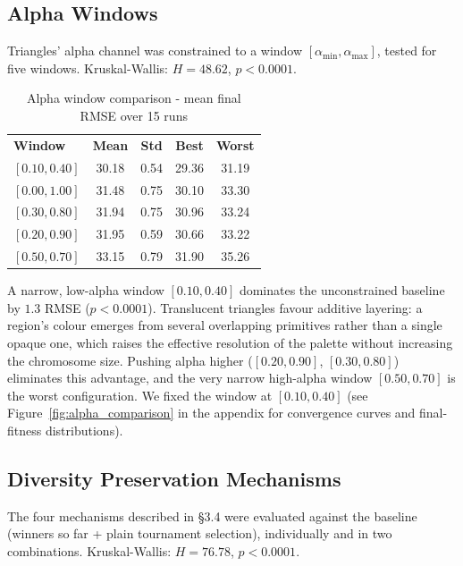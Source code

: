 \documentclass[11pt,a4paper]{article}
\newcommand{\tH}[1]{\textcolor{novagreen}{\textbf{#1}}}
\newcommand{\gmid}{\arrayrulecolor{novagreen}\midrule\arrayrulecolor{black}}
\begin{document}
\subsection{Alpha Windows}

Triangles' alpha channel was constrained to a window
$[\alpha_{\min}, \alpha_{\max}]$, tested for five windows. Kruskal-Wallis:
$H = 48.62$, $p < 0.0001$.

\begin{table}[h]
\centering
\begin{tabular}{lcccc}
\toprule
\tH{Window} & \tH{Mean} & \tH{Std} & \tH{Best} & \tH{Worst} \\
\gmid
$[0.10, 0.40]$ & 30.18 & 0.54 & 29.36 & 31.19 \\
$[0.00, 1.00]$ & 31.48 & 0.75 & 30.10 & 33.30 \\
$[0.30, 0.80]$ & 31.94 & 0.75 & 30.96 & 33.24 \\
$[0.20, 0.90]$ & 31.95 & 0.59 & 30.66 & 33.22 \\
$[0.50, 0.70]$ & 33.15 & 0.79 & 31.90 & 35.26 \\
\bottomrule
\end{tabular}
\caption{Alpha window comparison - mean final RMSE over 15 runs}
\end{table}

A narrow, low-alpha window $[0.10, 0.40]$ dominates the unconstrained baseline
by $1.3$ RMSE ($p < 0.0001$). Translucent triangles favour additive layering:
a region's colour emerges from several overlapping primitives rather than a
single opaque one, which raises the effective resolution of the palette
without increasing the chromosome size. Pushing alpha higher
($[0.20, 0.90]$, $[0.30, 0.80]$) eliminates this advantage, and the very
narrow high-alpha window $[0.50, 0.70]$ is the worst configuration. We fixed
the window at $[0.10, 0.40]$ (see Figure~\ref{fig:alpha_comparison} in
the appendix for convergence curves and final-fitness distributions).

\subsection{Diversity Preservation Mechanisms}

The four mechanisms described in \S3.4 were evaluated against
the baseline (winners so far + plain tournament selection), individually and
in two combinations. Kruskal-Wallis: $H = 76.78$, $p < 0.0001$.
\end{document}
